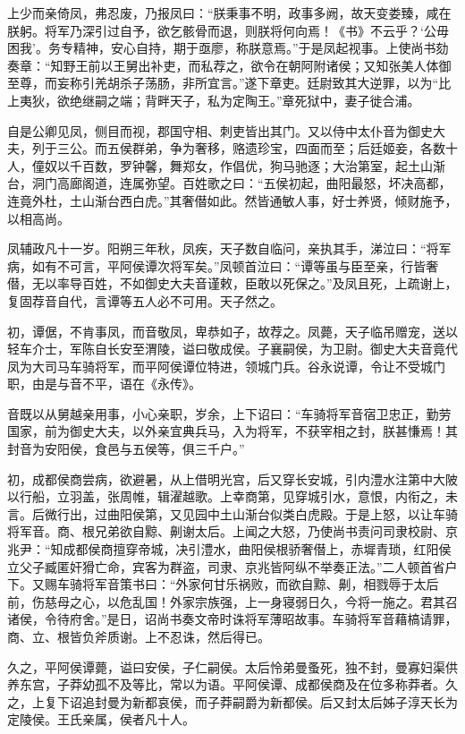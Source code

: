 \documentclass[]{article}
\begin{document}
上少而亲倚凤，弗忍废，乃报凤曰：``朕秉事不明，政事多阙，故天变娄臻，咸在朕躬。将军乃深引过自予，欲乞骸骨而退，则朕将何向焉！《书》不云乎？`公毋困我'。务专精神，安心自持，期于亟廖，称朕意焉。''于是凤起视事。上使尚书劾奏章：``知野王前以王舅出补吏，而私荐之，欲令在朝阿附诸侯；又知张美人体御至尊，而妄称引羌胡杀子荡肠，非所宜言。''遂下章吏。廷尉致其大逆罪，以为``比上夷狄，欲绝继嗣之端；背畔天子，私为定陶王。''章死狱中，妻子徙合浦。

自是公卿见凤，侧目而视，郡国守相、刺吏皆出其门。又以侍中太仆音为御史大夫，列于三公。而五侯群弟，争为奢移，赂遗珍宝，四面而至；后廷姬妾，各数十人，僮奴以千百数，罗钟馨，舞郑女，作倡优，狗马驰逐；大治第室，起土山渐台，洞门高廊阁道，连属弥望。百姓歌之曰：``五侯初起，曲阳最怒，坏决高都，连竟外杜，土山渐台西白虎。''其奢僣如此。然皆通敏人事，好士养贤，倾财施予，以相高尚。

凤辅政凡十一岁。阳朔三年秋，凤疾，天子数自临问，亲执其手，涕泣曰：``将军病，如有不可言，平阿侯谭次将军矣。''凤顿首泣曰：``谭等虽与臣至亲，行皆奢僣，无以率导百姓，不如御史大夫音谨敕，臣敢以死保之。''及凤且死，上疏谢上，复固荐音自代，言谭等五人必不可用。天子然之。

初，谭倨，不肯事凤，而音敬凤，卑恭如子，故荐之。凤薨，天子临吊赠宠，送以轻车介士，军陈自长安至渭陵，谥曰敬成侯。子襄嗣侯，为卫尉。御史大夫音竟代凤为大司马车骑将军，而平阿侯谭位特进，领城门兵。谷永说谭，令让不受城门职，由是与音不平，语在《永传》。

音既以从舅越亲用事，小心亲职，岁余，上下诏曰：``车骑将军音宿卫忠正，勤劳国家，前为御史大夫，以外亲宜典兵马，入为将军，不获宰相之封，朕甚慊焉！其封音为安阳侯，食邑与五侯等，俱三千户。''

初，成都侯商尝病，欲避暑，从上借明光宫，后又穿长安城，引内澧水注第中大陂以行船，立羽盖，张周帷，辑濯越歌。上幸商第，见穿城引水，意恨，内衔之，未言。后微行出，过曲阳侯第，又见园中土山渐台似类白虎殿。于是上怒，以让车骑将军音。商、根兄弟欲自黥、劓谢太后。上闻之大怒，乃使尚书责问司隶校尉、京兆尹：``知成都侯商擅穿帝城，决引澧水，曲阳侯根骄奢僣上，赤墀青琐，红阳侯立父子臧匿奸猾亡命，宾客为群盗，司隶、京兆皆阿纵不举奏正法。''二人顿首省户下。又赐车骑将军音策书曰：``外家何甘乐祸败，而欲自黥、劓，相戮辱于太后前，伤慈母之心，以危乱国！外家宗族强，上一身寝弱日久，今将一施之。君其召诸侯，令待府舍。''是日，诏尚书奏文帝时诛将军薄昭故事。车骑将军音藉槁请罪，商、立、根皆负斧质谢。上不忍诛，然后得已。

久之，平阿侯谭薨，谥曰安侯，子仁嗣侯。太后怜弟曼蚤死，独不封，曼寡妇渠供养东宫，子莽幼孤不及等比，常以为语。平阿侯谭、成都侯商及在位多称莽者。久之，上复下诏追封曼为新都哀侯，而子莽嗣爵为新都侯。后又封太后姊子淳天长为定陵侯。王氏亲属，侯者凡十人。
\end{document}
